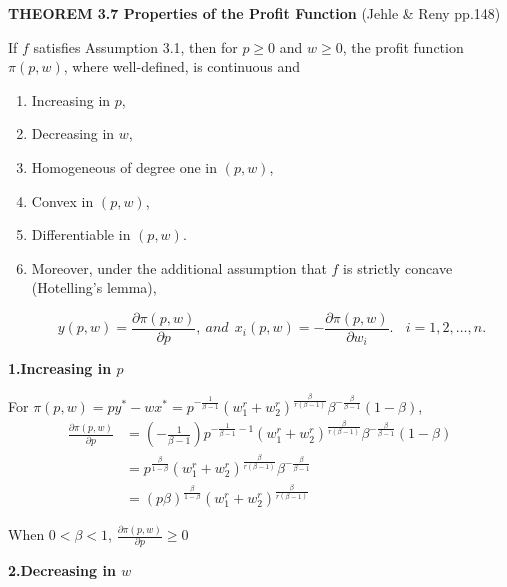 \documentclass{article}
\begin{document}
\begin{mdframed}[backgroundcolor=blue!20,linecolor=white]

\textbf{THEOREM 3.7 Properties of the Profit Function} (Jehle \& Reny pp.148)

If $f$ satisfies Assumption 3.1, then for $p \ge 0$ and $w \ge 0$, the profit function $\pi (p,w)$, where well-defined, is continuous and

\begin{enumerate}

\item Increasing in $p$,
\item Decreasing in $w$,
\item Homogeneous of degree one in $(p,w)$,
\item Convex in $(p,w)$,
\item Differentiable in $(p,w)$.
\item Moreover, under the additional assumption that $f$ is strictly concave \\ (Hotelling's lemma),

$$y(p,w) = \frac{\partial \pi(p,w)}{\partial p},\ and \ \ x_i(p,w) = - \frac{\partial \pi(p,w)}{\partial w_i}. \ \ \ \ i = 1,2, \dots , n.$$
\end{enumerate}
\end{mdframed}

\textbf{1.Increasing in $p$}

For $\pi(p,w) = py^* - wx^* = p^{-\frac{1}{\beta - 1}} (w_1^r + w_2^r)^{\frac{\beta}{r(\beta - 1)}}\beta^{-\frac{\beta}{\beta - 1}}(1-\beta)$,
\begin{align*}
\frac{\partial \pi(p, w)}{\partial p} &= (-\frac{1}{\beta - 1})p^{-\frac{1}{\beta - 1}-1} (w_1^r + w_2^r)^{\frac{\beta}{r(\beta - 1)}}\beta^{-\frac{\beta}{\beta - 1}}(1-\beta) \\
&= p^{\frac{\beta}{1 - \beta}} (w_1^r + w_2^r)^{\frac{\beta}{r(\beta - 1)}}\beta^{-\frac{\beta}{\beta - 1}} \\
&= (p\beta)^{\frac{\beta}{1 - \beta}} (w_1^r + w_2^r)^{\frac{\beta}{r(\beta - 1)}}
\end{align*}

When $0<\beta <1$, $\frac{\partial \pi(p, w)}{\partial p} \ge 0 $

\vspace{3mm}
\textbf{2.Decreasing in $w$}
\end{document}
